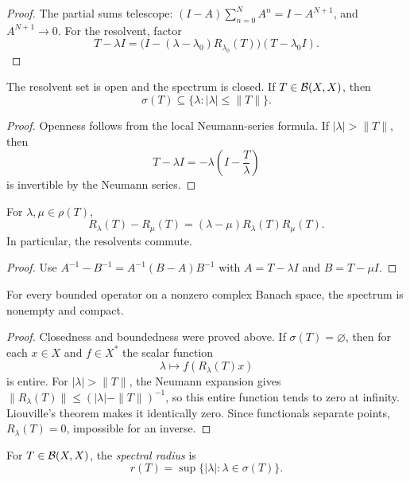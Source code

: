 \begin{proof}
The partial sums telescope:
$(I-A)\sum_{n=0}^N A^n=I-A^{N+1}$, and $A^{N+1}\to0$.  For the resolvent,
factor
\[
  T-\lambda I
  =\bigl(I-(\lambda-\lambda_0)R_{\lambda_0}(T)\bigr)
    (T-\lambda_0I).
\]
\end{proof}

\begin{notecorollary}
The resolvent set is open and the spectrum is closed.  If $T\in\mathcal{B}(X,X)$,
then
\[
  \sigma(T)\subseteq\{\lambda:|\lambda|\le\|T\|\}.
\]
\end{notecorollary}

\begin{proof}
Openness follows from the local Neumann-series formula.  If
$|\lambda|>\|T\|$, then
\[
  T-\lambda I=-\lambda\left(I-\frac{T}{\lambda}\right)
\]
is invertible by the Neumann series.
\end{proof}

\begin{notetheorem}
For $\lambda,\mu\in\rho(T)$,
\[
  R_\lambda(T)-R_\mu(T)
  =(\lambda-\mu)R_\lambda(T)R_\mu(T).
\]
In particular, the resolvents commute.
\end{notetheorem}

\begin{proof}
Use $A^{-1}-B^{-1}=A^{-1}(B-A)B^{-1}$ with
$A=T-\lambda I$ and $B=T-\mu I$.
\end{proof}

\begin{notetheorem}
For every bounded operator on a nonzero complex Banach space, the spectrum is
nonempty and compact.
\end{notetheorem}

\begin{proof}
Closedness and boundedness were proved above.  If $\sigma(T)=\varnothing$,
then for each $x\in X$ and $f\in X^*$ the scalar function
\[
  \lambda\longmapsto f(R_\lambda(T)x)
\]
is entire.  For $|\lambda|>\|T\|$, the Neumann expansion gives
$\|R_\lambda(T)\|\le(|\lambda|-\|T\|)^{-1}$, so this entire function tends to
zero at infinity.  Liouville's theorem makes it identically zero.  Since
functionals separate points, $R_\lambda(T)=0$, impossible for an inverse.
\end{proof}

\begin{notedefinition}
For $T\in\mathcal{B}(X,X)$, the \emph{spectral radius} is
\[
  r(T)=\sup\{|\lambda|:\lambda\in\sigma(T)\}.
\]
\end{notedefinition}

